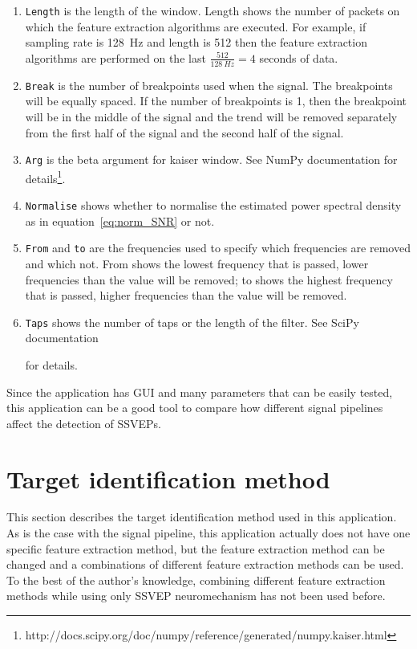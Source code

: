 \begin{enumerate}
	\item \texttt{Length} is the length of the window. Length shows the number of packets on which the \gls{feature extraction} algorithms are executed. For example, if \gls{sampling rate} is \SI{128}{Hz} and length is 512 then the \gls{feature extraction} algorithms are performed on the last $\frac{512}{\SI{128}{Hz}}=4$ seconds of data.
	\item \texttt{Break} is the number of breakpoints used when  the signal. The breakpoints will be equally spaced. If the number of breakpoints is 1, then the breakpoint will be in the middle of the signal and the trend will be removed separately from the first half of the signal and the second half of the signal.
	\item \texttt{Arg} is the beta argument for kaiser window. See NumPy documentation for details\footnote{http://docs.scipy.org/doc/numpy/reference/generated/numpy.kaiser.html}.
	\item \texttt{Normalise} shows whether to normalise the estimated \gls{power spectral density} as in equation~\ref{eq:norm_SNR} or not.
	\item \texttt{From} and \texttt{to} are the frequencies used to specify which frequencies are removed and which not. From shows the lowest frequency that is passed, lower frequencies than the value will be removed; to shows the highest frequency that is passed, higher frequencies than the value will be removed.
	\item \texttt{Taps} shows the number of taps or the length of the filter. See SciPy documentation\begin{NoHyper}\addtocounter{footnote}{-2}\footnotemark\addtocounter{footnote}{1}\end{NoHyper} for details.
\end{enumerate}

Since the application has \gls{GUI} and many parameters that can be easily tested, this application can be a good tool to compare how different signal pipelines affect the detection of \glspl{SSVEP}.

\section{Target identification method}
\label{sec:identification}

This section describes the \gls{target} identification method used in this application. As is the case with the signal pipeline, this application actually does not have one specific \gls{feature extraction} method, but the \gls{feature extraction} method can be changed and a combinations of different \gls{feature extraction} methods can be used. To the best of the author's knowledge, combining different \gls{feature extraction} methods while using only \gls{SSVEP} neuromechanism has not been used before.

